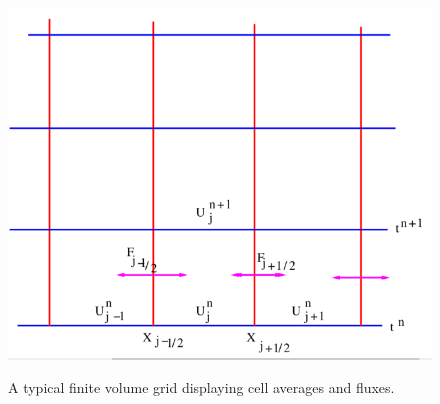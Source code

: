 \documentclass{article}
\begin{document}
\begin{figure}[h]
    \centering
    \includegraphics[width=12cm,height=10cm]{Screenshot 2022-01-23 212157.png}
    \caption{A typical finite volume grid displaying cell averages and fluxes.}
    \label{fig:my_label}
\end{figure}


\printbibliography
\end{document}
